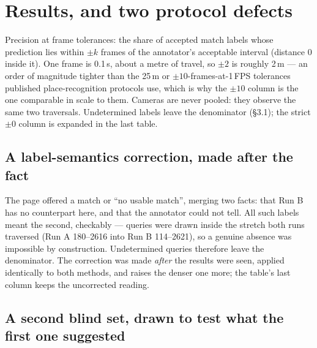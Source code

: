 \documentclass[10pt,a4paper]{article}
\begin{document}
\section{Results, and two protocol defects}

\vspace{-2pt}
{\small}
\vspace{-1pt}

{\small Precision at frame tolerances: the share of accepted match labels whose
prediction lies within $\pm k$ frames of the annotator's acceptable interval
(distance 0 inside it). One frame is 0.1\,s, about a metre of travel, so
$\pm2$ is roughly 2\,m --- an order of magnitude tighter than the 25\,m or
$\pm10$-frames-at-1\,FPS tolerances published place-recognition protocols use,
which is why the $\pm10$ column is the one comparable in scale to them. Cameras
are never pooled: they observe the same two traversals. Undetermined labels
leave the denominator (\S3.1); the strict $\pm0$ column is expanded in the last
table.}

\subsection{A label-semantics correction, made after the fact}

The page offered a match or ``no usable match'', merging two facts: that Run B
has no counterpart here, and that the annotator could not tell. All
\UndeterminedLabels{} such labels meant the second, checkably --- queries were
drawn inside the stretch both runs traversed (Run A 180--2616 into Run B
114--2621), so a genuine absence was impossible by construction. Undetermined
queries therefore leave the denominator. The correction was made \emph{after}
the results were seen, applied identically to both methods, and raises the
denser one more; the table's last column keeps the uncorrected reading.

\subsection{A second blind set, drawn to test what the first one suggested}
\end{document}
